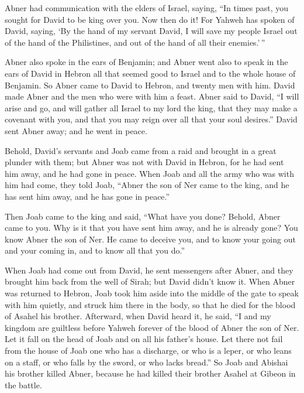  Abner had communication with the elders of Israel, saying,
``In times past, you sought for David to be king over you. 
Now then do it! For Yahweh has spoken of David, saying, `By the hand of
my servant David, I will save my people Israel out of the hand of the
Philistines, and out of the hand of all their enemies.'\,''

 Abner also spoke in the ears of Benjamin; and Abner went
also to speak in the ears of David in Hebron all that seemed good to
Israel and to the whole house of Benjamin.  So Abner came
to David to Hebron, and twenty men with him. David made Abner and the
men who were with him a feast.  Abner said to David, ``I
will arise and go, and will gather all Israel to my lord the king, that
they may make a covenant with you, and that you may reign over all that
your soul desires.'' David sent Abner away; and he went in peace.

 Behold, David's servants and Joab came from a raid and
brought in a great plunder with them; but Abner was not with David in
Hebron, for he had sent him away, and he had gone in peace.
 When Joab and all the army who was with him had come, they
told Joab, ``Abner the son of Ner came to the king, and he has sent him
away, and he has gone in peace.''

 Then Joab came to the king and said, ``What have you done?
Behold, Abner came to you. Why is it that you have sent him away, and he
is already gone?  You know Abner the son of Ner. He came to
deceive you, and to know your going out and your coming in, and to know
all that you do.''

 When Joab had come out from David, he sent messengers
after Abner, and they brought him back from the well of Sirah; but David
didn't know it.  When Abner was returned to Hebron, Joab
took him aside into the middle of the gate to speak with him quietly,
and struck him there in the body, so that he died for the blood of
Asahel his brother.  Afterward, when David heard it, he
said, ``I and my kingdom are guiltless before Yahweh forever of the
blood of Abner the son of Ner.  Let it fall on the head of
Joab and on all his father's house. Let there not fail from the house of
Joab one who has a discharge, or who is a leper, or who leans on a
staff, or who falls by the sword, or who lacks bread.''  So
Joab and Abishai his brother killed Abner, because he had killed their
brother Asahel at Gibeon in the battle.

